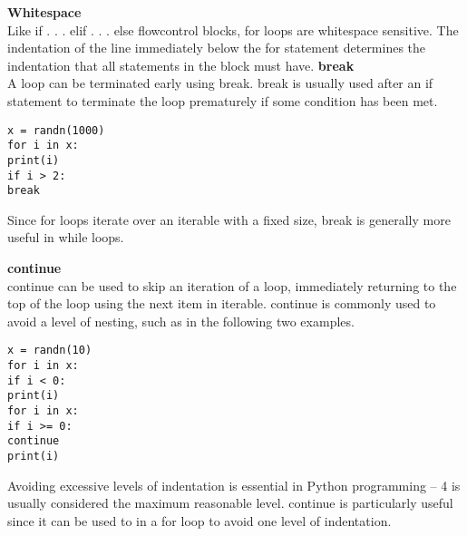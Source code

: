\documentclass[Pydata.tex]{subfiles}
\begin{document}
\textbf{Whitespace}\\
Like if . . . elif . . . else flowcontrol blocks, for loops are whitespace sensitive. The indentation of the line
immediately below the for statement determines the indentation that all statements in the block must
have.
\textbf{break}\\
A loop can be terminated early using break. break is usually used after an if statement to terminate the
loop prematurely if some condition has been met.
\begin{framed}
\begin{verbatim}
x = randn(1000)
for i in x:
print(i)
if i > 2:
break
\end{verbatim}
\end{framed}
Since for loops iterate over an iterable with a fixed size, break is generally more useful in while loops.

\textbf{continue}\\
continue can be used to skip an iteration of a loop, immediately returning to the top of the loop using the
next item in iterable. continue is commonly used to avoid a level of nesting, such as in the following two
examples.
\begin{framed}
\begin{verbatim}
x = randn(10)
for i in x:
if i < 0:
print(i)
for i in x:
if i >= 0:
continue
print(i)
\end{verbatim}
\end{framed}
Avoiding excessive levels of indentation is essential in Python programming – 4 is usually considered the
maximum reasonable level. continue is particularly useful since it can be used to in a for loop to avoid
one level of indentation.
\newpage
\end{document}
